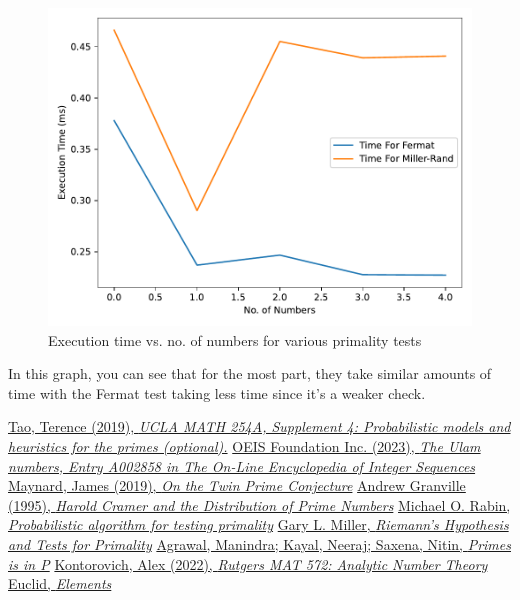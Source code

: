\documentclass[conference]{IEEEtran}
\begin{document}
\begin{figure}[H]
  \centering
  \includegraphics[width=\linewidth,keepaspectratio]{Fermat-MillerRand.pdf}
  \caption{Execution time vs. no. of numbers for various primality tests}
\end{figure}

In this graph, you can see that for the most part, they take similar amounts of time with the Fermat test taking less time since it's a weaker check.

\begin{thebibliography}{00}
     \href{https://terrytao.wordpress.com/2015/01/04/254a-supplement-4-probabilistic-models-and-heuristics-for-the-primes-optional.}{Tao, Terence (2019), \textit{UCLA MATH 254A, Supplement 4: Probabilistic models and heuristics for the primes (optional).}}
     \href{https://oeis.org/A002858}{OEIS Foundation Inc. (2023), \textit{The Ulam numbers, Entry A002858 in The On-Line Encyclopedia of Integer Sequences}}
     \href{https://arxiv.org/abs/1910.14674}{Maynard, James (2019), \textit{On the Twin Prime Conjecture}}
     \href{https://chance.dartmouth.edu/chance_news/for_chance_news/Riemann/cramer.pdf}{Andrew Granville (1995), \textit{Harold Cramer and the Distribution of Prime Numbers}}
    \href{https://doi.org/10.1016%2F0022-314X%2880%2990084-0}{Michael O. Rabin, \textit{Probabilistic algorithm for testing primality}}
    \href{https://doi.org/10.1145%2F800116.803773}{Gary L. Miller, \textit{Riemann's Hypothesis and Tests for Primality}}
    \href{https://doi.org/10.4007%2Fannals.2004.160.781}{Agrawal, Manindra; Kayal, Neeraj; Saxena, Nitin, \textit{Primes is in P}}
    \href{https://sites.math.rutgers.edu/~alexk/2022S572/index.html}{Kontorovich, Alex (2022), \textit{Rutgers MAT 572: Analytic Number Theory}}
    \href{https://mathcs.clarku.edu/~djoyce/java/elements/elements.html}{Euclid, \textit{Elements}}
\end{thebibliography}
\vspace{12pt}
\end{document}
